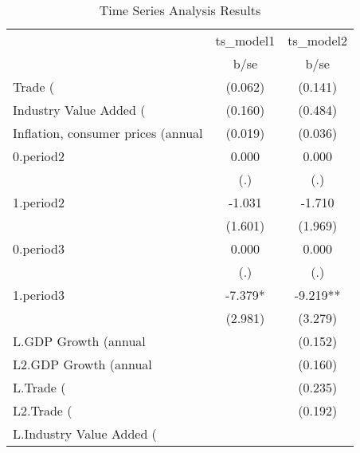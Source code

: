 \begin{table}[htbp]\centering\caption{Time Series Analysis Results}\label{tab:tsresults}\begin{tabular}{lcc}
                    &   ts_model1   &   ts_model2   \\
                    &        b/se   &        b/se   \\
Trade (%
                    &     (0.062)   &     (0.141)   \\
Industry Value Added (%
                    &     (0.160)   &     (0.484)   \\
Inflation, consumer prices (annual %
                    &     (0.019)   &     (0.036)   \\
0.period2           &       0.000   &       0.000   \\
                    &         (.)   &         (.)   \\
1.period2           &      -1.031   &      -1.710   \\
                    &     (1.601)   &     (1.969)   \\
0.period3           &       0.000   &       0.000   \\
                    &         (.)   &         (.)   \\
1.period3           &      -7.379*  &      -9.219** \\
                    &     (2.981)   &     (3.279)   \\
L.GDP Growth (annual %
                    &               &     (0.152)   \\
L2.GDP Growth (annual %
                    &               &     (0.160)   \\
L.Trade (%
                    &               &     (0.235)   \\
L2.Trade (%
                    &               &     (0.192)   \\
L.Industry Value Added (%

\end{tabular}
\end{table}
